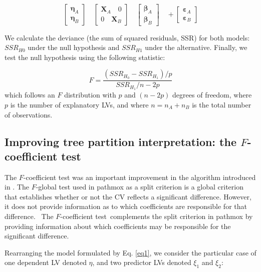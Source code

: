 \begin{equation}
\label{eq23}
\left[\begin{array}{l}
\boldsymbol{\eta}_A \\
\boldsymbol{\eta}_B 
\end{array}\right] \quad
\left[\begin{array}{cc}
\textbf{X}_A \quad0\\
0 \quad\textbf{X}_B 
\end{array}\right] \quad
\left[\begin{array}{l}
\boldsymbol{\beta}_A \\
\boldsymbol{\beta}_B
\end{array}\right]  \quad +
\left[\begin{array}{l}
\boldsymbol{\varepsilon}_A \\
\boldsymbol{\varepsilon}_B 
\end{array}\right] 
\end{equation}

We calculate the deviance (the sum of squared residuals, SSR) for both models: $SSR_{H0}$ under the null hypothesis and $SSR_{H1}$ under the alternative. Finally, we test the null hypothesis using the following statistic:

\begin{equation}
\label{F_global}
F  = \frac{\left(SSR_{H_0}-SSR_{H_1}\right) \Bigg/p}{SSR_{H_1}\Bigg/n-2p}   
\end{equation}
which follows an $F$ distribution with $p$ and $\left(n - 2p\right)$ degrees of freedom, where $p$ is the number of explanatory LVs, and where $n = n_A + n_B$ is the total number of observations.

\subsection{Improving tree partition interpretation: the $F$-coefficient test}

The $F$-coefficient test was an important improvement in the algorithm introduced in \citet{Lamberti17}. The $F$-global test used in pathmox as a split criterion is a global criterion that establishes whether or not the CV reflects a significant difference. However, it does not provide information as to which coefficients are responsible for that difference.  The $F$-coefficient test complements the split criterion in pathmox by providing information about which coefficients may be responsible for the significant difference.

Rearranging  the model formulated by Eq. \ref{eq1}, we consider the particular case of one dependent LV denoted $\eta$, and two predictor LVs denoted $\xi_1$ and $\xi_2$: 

